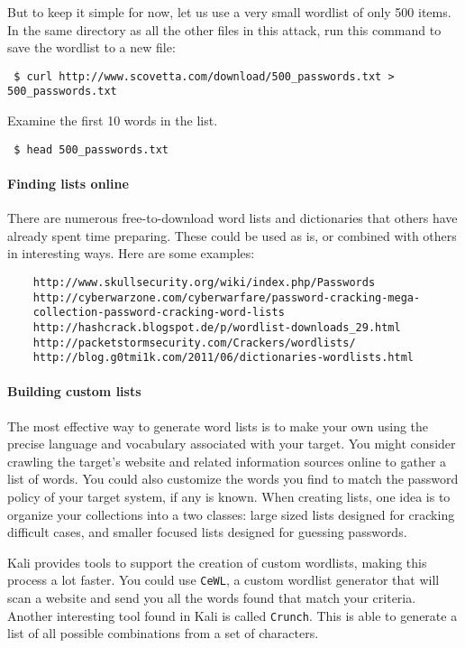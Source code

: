   But to keep it simple for now, let us use a very small wordlist of only 500 items. In the same directory as all the other files in this attack, run this command to save the wordlist to a new file:
  \begin{verbatim} $ curl http://www.scovetta.com/download/500_passwords.txt > 500_passwords.txt \end{verbatim}

  \noindent
  Examine the first 10 words in the list.
  \begin{verbatim} $ head 500_passwords.txt \end{verbatim}

  \paragraph{Finding lists online}
  There are numerous free-to-download word lists and dictionaries that others have already spent time preparing. These could be used as is, or combined with others in interesting ways. Here are some examples:
  \begin{verbatim}
    http://www.skullsecurity.org/wiki/index.php/Passwords
    http://cyberwarzone.com/cyberwarfare/password-cracking-mega-
    collection-password-cracking-word-lists
    http://hashcrack.blogspot.de/p/wordlist-downloads_29.html
    http://packetstormsecurity.com/Crackers/wordlists/
    http://blog.g0tmi1k.com/2011/06/dictionaries-wordlists.html
  \end{verbatim}

  \paragraph{Building custom lists}
  The most effective way to generate word lists is to make your own using the precise language and vocabulary associated with your target. You might consider crawling the target’s website and related information sources online to gather a list of words. You could also customize the words you find to match the password policy of your target system, if any is known. When creating lists, one idea is to organize your collections into a two classes: large sized lists designed for cracking difficult cases, and smaller focused lists designed for guessing passwords.

  Kali provides tools to support the creation of custom wordlists, making this process a lot faster. You could use \verb|CeWL|, a custom wordlist generator that will scan a website and send you all the words found that match your criteria. Another interesting tool found in Kali is called \verb|Crunch|. This is able to generate a list of all possible combinations from a set of characters.

